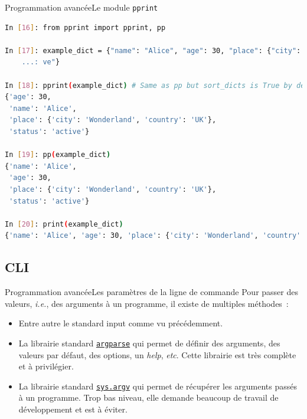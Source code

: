 \documentclass{beamer}
\begin{document}
    \begin{frame}[fragile]{Programmation avancée}{Le module \lstinline{pprint}}
        \begin{lstlisting}[language=Bash]
In [16]: from pprint import pprint, pp

In [17]: example_dict = {"name": "Alice", "age": 30, "place": {"city": "Wonderland", "country": "UK"}, "status": "acti
    ...: ve"}

In [18]: pprint(example_dict) # Same as pp but sort_dicts is True by default
{'age': 30,
 'name': 'Alice',
 'place': {'city': 'Wonderland', 'country': 'UK'},
 'status': 'active'}

In [19]: pp(example_dict)
{'name': 'Alice',
 'age': 30,
 'place': {'city': 'Wonderland', 'country': 'UK'},
 'status': 'active'}

In [20]: print(example_dict)
{'name': 'Alice', 'age': 30, 'place': {'city': 'Wonderland', 'country': 'UK'}, 'status': 'active'}
        \end{lstlisting}
    \end{frame}

    \subsection{CLI}\label{subsec:cli}

    \begin{frame}{Programmation avancée}{Les paramètres de la ligne de commande}
        Pour passer des valeurs, \textit{i.e.}, des arguments à un programme, il existe de multiples méthodes~:
        \begin{itemize}
            \item Entre autre le standard input comme vu précédemment.
            \item La librairie standard \href{https://docs.python.org/3/library/argparse.html}{\lstinline{argparse}} qui permet de définir des arguments, des valeurs par défaut, des options, un \textit{help}, \textit{etc}.
            Cette librairie est très complète et à privilégier.
            \item La librairie standard \href{https://docs.python.org/3/library/sys.html\#sys.argv}{\lstinline{sys.argv}} qui permet de récupérer les arguments passés à un programme.
            Trop bas niveau, elle demande beaucoup de travail de développement et est à éviter.
        \end{itemize}
    \end{frame}
\end{document}
